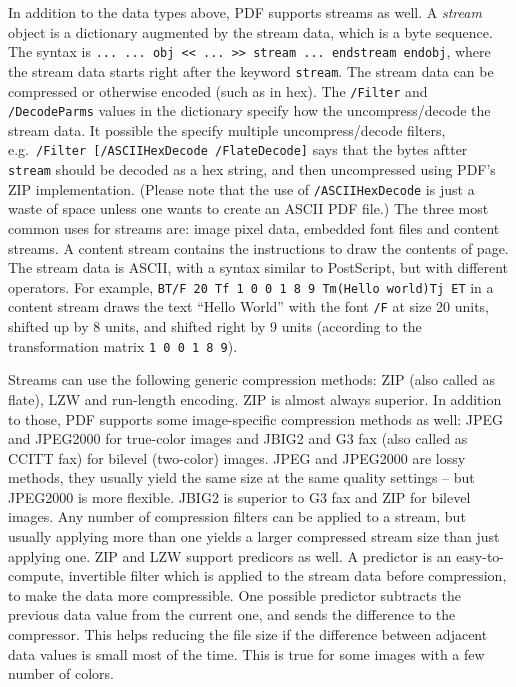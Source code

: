 \documentclass{ltugproc}
\begin{document}
In addition to the data types above, PDF supports streams as well. A
\emph{stream} object is a dictionary augmented by the stream data, which is
a byte sequence. The syntax is \texttt{... ... obj << ... >> stream ...
endstream endobj}, where the stream data starts right after the keyword
\texttt{stream}. The stream data can be compressed or otherwise encoded
(such as in hex). The \texttt{/Filter} and \texttt{/DecodeParms} values in
the dictionary specify how the uncompress/\allowbreak decode the stream data.
It possible the specify multiple uncompress/\allowbreak decode filters,
e.g.\ \texttt{/Filter [/ASCIIHexDecode /FlateDecode]} says that the bytes
aftter \texttt{stream} should be decoded as a hex string, and then
uncompressed using PDF's ZIP implementation. (Please note that the use of
\texttt{/ASCIIHexDecode} is just a waste of space unless one wants to create
an ASCII PDF file.) The three most common uses for
streams are: image pixel data, embedded font files and content streams.
A content stream contains the instructions to draw the contents of page. The
stream data is ASCII, with a syntax similar to PostScript, but with
different operators. For example, \texttt{BT/F 20 Tf 1 0 0 1 8 9
Tm(Hello world)Tj ET} in a content stream draws the text ``Hello World''
with the font \texttt{/F} at size 20 units, shifted up by 8 units, and
shifted right by 9 units (according to the transformation matrix
\texttt{1 0 0 1 8 9}).

Streams can use the following generic compression methods: ZIP (also called
as flate), LZW and run-length encoding. ZIP is almost always superior. In
addition to those, PDF supports some image-specific compression methods as
well: JPEG and JPEG2000 for true-color images and JBIG2 and G3 fax (also
called as CCITT fax) for bilevel (two-color) images. JPEG and JPEG2000 are
lossy methods, they usually yield the same size at the same quality
settings -- but JPEG2000 is more flexible. JBIG2 is superior to G3 fax and
ZIP for bilevel images. Any number of compression filters can be applied to
a stream, but usually applying more than one yields a larger compressed
stream size than just applying one. ZIP and LZW support predicors as well. A
predictor is an easy-to-compute, invertible filter which is applied to the
stream data before compression, to make the data more compressible. One
possible predictor subtracts the previous data value from the current one,
and sends the difference to the compressor. This helps reducing the file
size if the difference between adjacent data values is small most of the
time. This is true for some images with a few number of colors.
\end{document}
